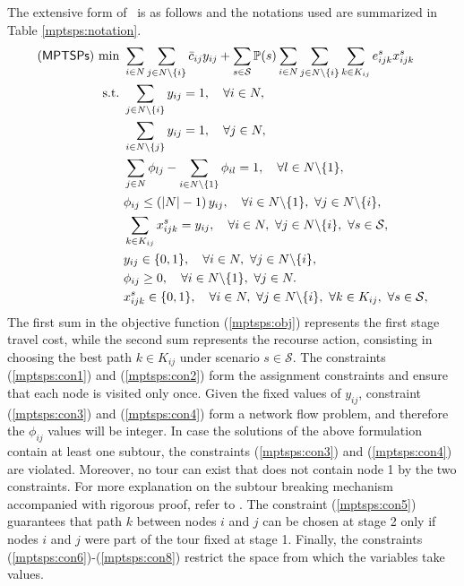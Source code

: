 The extensive form of \mptsps\ is as follows and the notations used are summarized in Table \ref{mptsps:notation}.
\begin{subequations} \label{mptsps:formulation}
	\begin{align}
	(\mptsps)\ \textrm{min}\ &\sum_{i\in N}\sum_{j\in N\backslash\{i\}}\bar{c}_{ij}y_{ij}+\sum_{s\in \mathcal{S}}\PP(s)\sum_{i\in N}\sum_{j\in N\backslash\{i\}}\sum_{k\in K_{ij}}e_{ijk}^{s}x_{ijk}^{s} \label{mptsps:obj} \\ 
	\textrm{s.t.}\ &\sum_{j\in N\backslash\{i\}}y_{ij}=1,\quad\forall i\in N, \label{mptsps:con1} \\ 
	&\sum_{i\in N\backslash\{j\}}y_{ij}=1,\quad\forall j\in N,\label{mptsps:con2} \\ 
	&\sum_{j\in N}\phi_{lj}-\sum_{i\in N\backslash\{1\}}\phi_{il}=1,\quad\forall l\in N\backslash\{1\}, \label{mptsps:con3}  \\ 
	&\phi_{ij}\le \left(|N|-1\right)y_{ij},\quad\forall i\in N\backslash\{1\},\ \forall j\in N\backslash\{i\}, \label{mptsps:con4} \\ 
	&\sum_{k\in K_{ij}}x_{ijk}^{s}=y_{ij},\quad\forall i\in N,\ \forall j\in N\backslash\{i\},\ \forall s\in \mathcal{S}, \label{mptsps:con5} \\ 
	&y_{ij}\in \{0,1\},\quad \forall i\in N,\ \forall j\in N\backslash\{i\}, \label{mptsps:con6} \\ 
	&\phi_{ij} \ge 0, \quad \forall i\in N\backslash\{1\},\ \forall j\in N. \label{mptsps:con7} \\
	&x_{ijk}^{s}\in\{0,1\},\quad\forall i\in N,\ \forall j\in N\backslash\{i\},\ \forall k\in K_{ij},\ \forall s\in \mathcal{S}, \label{mptsps:con8} 
	\end{align}
\end{subequations}
The first sum in the objective function (\ref{mptsps:obj}) represents the first stage travel cost, while the second sum represents the recourse action, consisting in choosing the best path $k\in K_{ij}$ under scenario $s\in\mathcal{S}$. The constraints (\ref{mptsps:con1}) and (\ref{mptsps:con2}) form the assignment constraints and ensure that each node is visited only once. Given the fixed values of $y_{ij}$, constraint (\ref{mptsps:con3}) and (\ref{mptsps:con4}) form a network flow problem, and therefore the $\phi_{ij}$ values will be integer. In case the solutions of the above formulation contain at least one subtour, the constraints (\ref{mptsps:con3}) and (\ref{mptsps:con4}) are violated. Moreover, no tour can exist that does not contain node 1 by the two constraints. For more explanation on the subtour breaking mechanism accompanied with rigorous proof, refer to \cite{journal:GG1978}. The constraint (\ref{mptsps:con5}) guarantees that path $k$ between nodes $i$ and $j$ can be chosen at stage 2 only if nodes $i$ and $j$ were part of the tour fixed at stage 1. Finally, the constraints (\ref{mptsps:con6})-(\ref{mptsps:con8}) restrict the space from which the variables take values.

